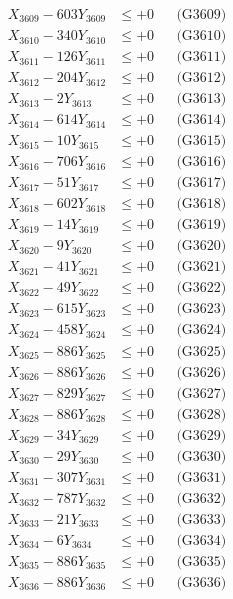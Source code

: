 \documentclass[a4paper,10pt]{article}
\begin{document}
{\begin{align}
X_{3609} - 603Y_{3609} &\leq +0 && \text{(G3609)} \\
X_{3610} - 340Y_{3610} &\leq +0 && \text{(G3610)} \\
\allowbreak
X_{3611} - 126Y_{3611} &\leq +0 && \text{(G3611)} \\
X_{3612} - 204Y_{3612} &\leq +0 && \text{(G3612)} \\
X_{3613} - 2Y_{3613} &\leq +0 && \text{(G3613)} \\
X_{3614} - 614Y_{3614} &\leq +0 && \text{(G3614)} \\
X_{3615} - 10Y_{3615} &\leq +0 && \text{(G3615)} \\
X_{3616} - 706Y_{3616} &\leq +0 && \text{(G3616)} \\
X_{3617} - 51Y_{3617} &\leq +0 && \text{(G3617)} \\
X_{3618} - 602Y_{3618} &\leq +0 && \text{(G3618)} \\
X_{3619} - 14Y_{3619} &\leq +0 && \text{(G3619)} \\
X_{3620} - 9Y_{3620} &\leq +0 && \text{(G3620)} \\
\allowbreak
X_{3621} - 41Y_{3621} &\leq +0 && \text{(G3621)} \\
X_{3622} - 49Y_{3622} &\leq +0 && \text{(G3622)} \\
X_{3623} - 615Y_{3623} &\leq +0 && \text{(G3623)} \\
X_{3624} - 458Y_{3624} &\leq +0 && \text{(G3624)} \\
X_{3625} - 886Y_{3625} &\leq +0 && \text{(G3625)} \\
X_{3626} - 886Y_{3626} &\leq +0 && \text{(G3626)} \\
X_{3627} - 829Y_{3627} &\leq +0 && \text{(G3627)} \\
X_{3628} - 886Y_{3628} &\leq +0 && \text{(G3628)} \\
X_{3629} - 34Y_{3629} &\leq +0 && \text{(G3629)} \\
X_{3630} - 29Y_{3630} &\leq +0 && \text{(G3630)} \\
\allowbreak
X_{3631} - 307Y_{3631} &\leq +0 && \text{(G3631)} \\
X_{3632} - 787Y_{3632} &\leq +0 && \text{(G3632)} \\
X_{3633} - 21Y_{3633} &\leq +0 && \text{(G3633)} \\
X_{3634} - 6Y_{3634} &\leq +0 && \text{(G3634)} \\
X_{3635} - 886Y_{3635} &\leq +0 && \text{(G3635)} \\
X_{3636} - 886Y_{3636} &\leq +0 && \text{(G3636)} \\

\end{align}}
\end{document}
